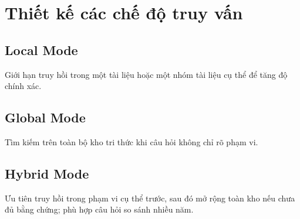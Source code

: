 ﻿\section{Thiết kế các chế độ truy vấn}

\subsection{Local Mode}

Giới hạn truy hồi trong một tài liệu hoặc một nhóm tài liệu cụ thể để tăng độ chính xác.

\subsection{Global Mode}

Tìm kiếm trên toàn bộ kho tri thức khi câu hỏi không chỉ rõ phạm vi.

\subsection{Hybrid Mode}

Ưu tiên truy hồi trong phạm vi cụ thể trước, sau đó mở rộng toàn kho nếu chưa đủ bằng chứng; phù hợp câu hỏi so sánh nhiều năm.
